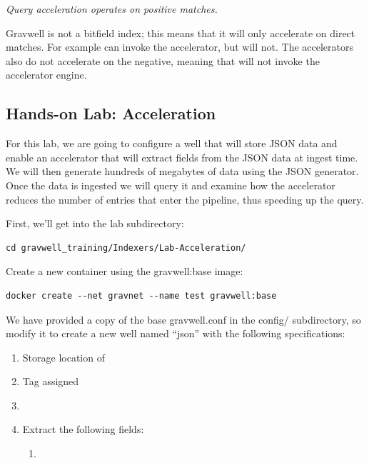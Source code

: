 {\textit{Query acceleration operates on positive matches.}

Gravwell is not a bitfield index; this means that it will only accelerate on direct matches.  For example  can invoke the accelerator, but  will not.  The accelerators also do not accelerate on the negative, meaning that  will not invoke the accelerator engine.

\clearpage
\subsection{Hands-on Lab: Acceleration}

For this lab, we are going to configure a well that will store JSON
data and enable an accelerator that will extract fields from the JSON
data at ingest time. We will then generate hundreds of megabytes of data
using the JSON generator. Once the data is ingested we will query
it and examine how the accelerator reduces the number of entries that
enter the pipeline, thus speeding up the query.

First, we'll get into the lab subdirectory:

\begin{Verbatim}[breaklines=true]
cd gravwell_training/Indexers/Lab-Acceleration/
\end{Verbatim}

Create a new container using the gravwell:base image:

\begin{Verbatim}[breaklines=true]
docker create --net gravnet --name test gravwell:base
\end{Verbatim}

We have provided a copy of the base gravwell.conf in the config/ subdirectory, 
so modify it to create a new well named ``json'' with the
following specifications:

\begin{enumerate}
	\item Storage location of 
	\item Tag  assigned
	\item {}
	\item Extract the following fields:
	\begin{enumerate}
		\item {}
	\end{enumerate}
\end{enumerate}

}
